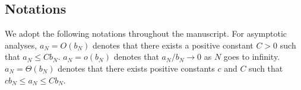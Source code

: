 \documentclass[12pt]{article}
\begin{document}




\subsection{Notations}  

We adopt the following notations throughout the manuscript. For asymptotic analyses, $a_N = {O}(b_N)$ denotes that there exists a positive constant $C>0$ such that $a_N \le Cb_N$. $a_N = o(b_N)$ denotes that $a_N/b_N \to 0$ as $N$ goes to infinity. $a_N =  \Theta(b_N)$ denotes that there exists positive constants $c$ and $C$ such that $cb_N\le a_N \le Cb_N$. 
\end{document}
